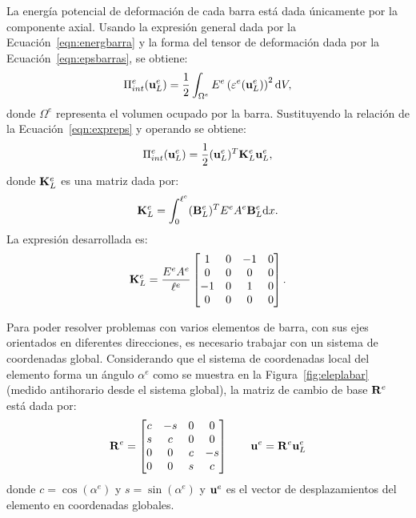 La energía potencial de deformación de cada barra está dada únicamente por la componente axial. Usando la expresión general dada por la Ecuación~\eqref{eqn:energbarra} y la forma del tensor de deformación dada por la Ecuación~\eqref{eqn:epsbarras}, se obtiene:
%
\begin{equation}
\Pi_{int}^e (\bfu_L^e) %
%
= \frac{1}{2} \int_{\Omega^e} E^e \left(\varepsilon^e (\bfu_L^e) \right)^2 \dif V ,
%
\end{equation}
%
donde $\Omega^e$ representa el volumen ocupado por la barra. %
%
Sustituyendo la relación de la Ecuación~\eqref{eqn:expreps} y operando se obtiene:
%
\begin{equation}
\Pi_{int}^e({\bf u}_L^e) = \frac{1}{2} ({\bf u}_L^e)^T {\bf K}_L^e {\bf u}_L^e ,
\end{equation}
%
donde ${\bf K}_L^e$ es una matriz dada por:
%
\begin{equation}\label{eqn:defK}
 {\bf K}_L^e = \int_{0}^{\ell^e} ({\bf B}_L^e)^T E^e A^e {\bf B}_L^e {\text{d}} x.
\end{equation}
%
La expresión desarrollada es:
%
\begin{equation}
{\bf K}_L^e = \frac{E^e A^e}{\ell^e} 
\left[
\begin{matrix}
1 & 0 & -1 & 0 \\
0 & 0 & 0 & 0\\
-1 & 0 &  1 & 0\\
0 & 0 & 0 & 0
\end{matrix}
\right].
\end{equation}
%

Para poder resolver problemas con varios elementos de barra, con sus ejes orientados en diferentes direcciones, es necesario trabajar con un sistema de coordenadas global. %
%
Considerando que el sistema de coordenadas local del elemento forma un ángulo $\alpha^e$ como se muestra en la Figura~\ref{fig:eleplabar} (medido antihorario desde el sistema global), la matriz de cambio de base ${\bf R}^e$ está dada por:
%
\begin{equation}\label{eqn:rotabarra}
{\bf R}^e = 
\left[
\begin{matrix}
c & -s & 0 & 0 \\
s & c & 0 & 0\\
0 & 0 &  c & -s\\
0 & 0 & s & c
\end{matrix}
\right]
\qquad
{\bf u}^e = {\bf R}^e {\bf u}^e_L
\end{equation}
%
donde $c=\cos(\alpha^e)$ y $s=\sin(\alpha^e)$ y ${\bf u}^e$ es el vector de desplazamientos del elemento en coordenadas globales. %
%

